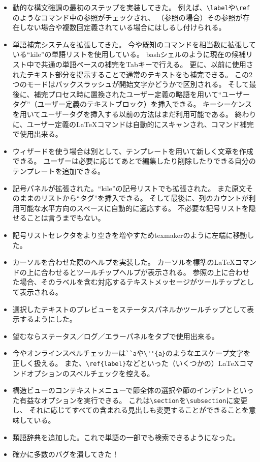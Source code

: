 \begin{itemize}
\item
  動的な構文強調の最初のステップを実装してきた。
  例えば、\verb+\label+や\verb+\ref+のようなコマンド中の参照がチェックされ、
  （参照の場合）その参照が存在しない場合や複数回定義されている場合にはしるし付けられる。
\item
  単語補完システムを拡張してきた。
  今や既知のコマンドを相当数に拡張している``kile''の単語リストを使用している。
  bashシェルのように現在の候補リスト中で共通の単語ベースの補完をTabキーで行える。
  更に、以前に使用されたテキスト部分を提示することで通常のテキストをも補完できる。
  この2つのモードはバックスラッシュが開始文字かどうかで区別される。
  そして最後に、補完プロセス時に置換されたユーザー定義の略語を用いて``ユーザータグ''（ユーザー定義のテキストブロック）を挿入できる。
  キーシーケンスを用いてユーザータグを挿入する以前の方法はまだ利用可能である。
  終わりに、ユーザー定義のLaTeXコマンドは自動的にスキャンされ、コマンド補完で使用出来る。
\item
  ウィザードを使う場合は別として、テンプレートを用いて新しく文章を作成できる。
  ユーザーは必要に応じてあとで編集したり削除したりできる自分のテンプレートを追加できる。
\item
  記号パネルが拡張された。``kile''の記号リストでも拡張された。
  また原文そのままのリストから``タグ''を挿入できる。
  そして最後に、列のカウントが利用可能な水平方向のスペースに自動的に適応する。
  不必要な記号リストを隠せることは言うまでもない。
\item
  記号リストセレクタをより空きを増やすためtexmakerのように左端に移動した。
\item
  カーソルを合わせた際のヘルプを実装した。
  カーソルを標準のLaTeXコマンドの上に合わせるとツールチップヘルプが表示される。
  参照の上に合わせた場合、そのラベルを含む対応するテキストメッセージがツールチップとして表示される。
\item
  選択したテキストのプレビューをステータスパネルかツールチップとして表示するようにした。
\item
  望むならステータス／ログ／エラーパネルをタブで使用出来る。
\item
  今やオンラインスペルチェッカーは\verb+``a+や\verb+\''{a}+のようなエスケープ文字を正しく扱える。
  また、\verb+\ref{label}+などといった（いくつかの）LaTeXコマンドオプションのスペルチェックを控える。
\item
  構造ビューのコンテキストメニューで節全体の選択や節のインデントといった有益なオプションを実行できる。
  これは\verb+\section+を\verb+\subsection+に変更し、
  それに応じてすべての含まれる見出しも変更することができることを意味している。
\item
  類語辞典を追加した。これで単語の一部でも検索できるようになった。
\item
  確かに多数のバグを潰してきた！
\end{itemize}
